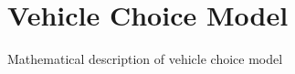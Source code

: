 \clearpage
\section{Vehicle Choice Model}
\label{sec:ChoiceModel}

Mathematical description of vehicle choice model
